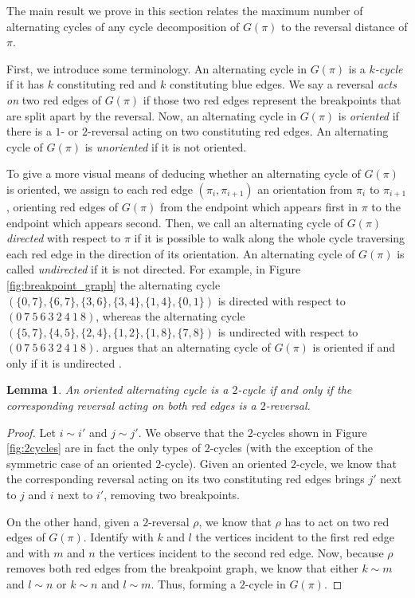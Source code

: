 \documentclass[11pt,DIV=11]{scrartcl}
\def\padding{\vspace{2em}}
\newtheorem{lemma}[theorem]{Lemma}
\theoremstyle{definition}
\theoremstyle{remark}
\begin{document}
The main result we prove in this section relates the maximum number of alternating cycles of any cycle decomposition of $G(\pi)$ to the reversal distance of $\pi$.\padding

First, we introduce some terminology. An alternating cycle in $G(\pi)$ is a \textit{$k$-cycle} if it has $k$ constituting red and $k$ constituting blue edges. We say a reversal \textit{acts on} two red edges of $G(\pi)$ if those two red edges represent the breakpoints that are split apart by the reversal. Now, an alternating cycle in $G(\pi)$ is \textit{oriented} if there is a $1$- or $2$-reversal acting on two constituting red edges. An alternating cycle of $G(\pi)$ is \textit{unoriented} if it is not oriented.

To give a more visual means of deducing whether an alternating cycle of $G(\pi)$ is oriented, we assign to each red edge $(\pi_i, \pi_{i+1})$ an orientation from $\pi_i$ to $\pi_{i+1}$, orienting red edges of $G(\pi)$ from the endpoint which appears first in $\pi$ to the endpoint which appears second. Then, we call an alternating cycle of $G(\pi)$ \textit{directed} with respect to $\pi$ if it is possible to walk along the whole cycle traversing each red edge in the direction of its orientation. An alternating cycle of $G(\pi)$ is called \textit{undirected} if it is not directed. For example, in Figure \ref{fig:breakpoint_graph} the alternating cycle $(\{0,7\},\{6,7\},\{3,6\},\{3,4\},\{1,4\},\{0,1\})$ is directed with respect to $(0\ 7\ 5\ 6\ 3\ 2\ 4\ 1\ 8)$, whereas the alternating cycle $(\{5,7\},\{4,5\},\{2,4\},\{1,2\},\{1,8\},\{7,8\})$ is undirected with respect to $(0\ 7\ 5\ 6\ 3\ 2\ 4\ 1\ 8)$. \citeauthor*{Caprara1997} argues that an alternating cycle of $G(\pi)$ is oriented if and only if it is undirected \cite{Caprara1997}.

\begin{lemma}
\label{lem:1}
An oriented alternating cycle is a $2$-cycle if and only if the corresponding reversal acting on both red edges is a $2$-reversal.
\end{lemma}

\begin{proof}
Let $i \sim i'$ and $j \sim j'$. We observe that the $2$-cycles shown in Figure \ref{fig:2cycles} are in fact the only types of $2$-cycles (with the exception of the symmetric case of an oriented $2$-cycle). Given an oriented $2$-cycle, we know that the corresponding reversal acting on its two constituting red edges brings $j'$ next to $j$ and $i$ next to $i'$, removing two breakpoints.

On the other hand, given a $2$-reversal $\rho$, we know that $\rho$ has to act on two red edges of $G(\pi)$. Identify with $k$ and $l$ the vertices incident to the first red edge and with $m$ and $n$ the vertices incident to the second red edge. Now, because $\rho$ removes both red edges from the breakpoint graph, we know that either $k \sim m$ and $l \sim n$ or $k \sim n$ and $l \sim m$. Thus, forming a $2$-cycle in $G(\pi)$.
\end{proof}
\end{document}
